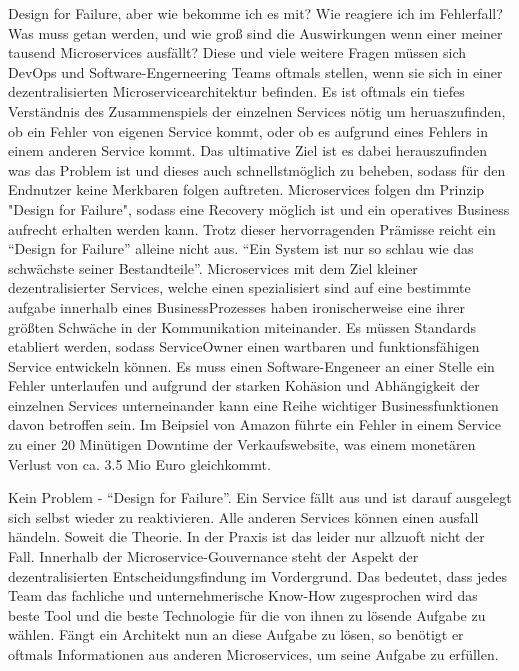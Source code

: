 \documentclass[
	12pt,
	BCOR=5mm,
	DIV=12,
	headinclude=on,
	footinclude=off,
	parskip=half,
	bibliography=totoc,
	listof=entryprefix,
	toc=listof,
	numbers=noenddot,
	plainfootsepline
]{scrreprt}
\begin{document}
Design for Failure, aber wie bekomme ich es mit? Wie reagiere ich im Fehlerfall? Was muss getan werden, und wie groß sind die Auswirkungen wenn einer meiner tausend Microservices ausfällt? Diese und viele weitere Fragen müssen sich DevOps und Software-Engerneering Teams oftmals stellen, wenn sie sich in einer dezentralisierten Microservicearchitektur befinden. Es ist oftmals ein tiefes Verständnis des Zusammenspiels der einzelnen Services nötig um heruaszufinden, ob ein Fehler von eigenen Service kommt, oder ob es aufgrund eines Fehlers in einem anderen Service kommt. Das ultimative Ziel ist es dabei herauszufinden was das Problem ist und dieses auch schnellstmöglich zu beheben, sodass für den Endnutzer keine Merkbaren folgen auftreten. Microservices folgen dm Prinzip "Design for Failure", sodass eine Recovery möglich ist und ein operatives Business aufrecht erhalten werden kann. Trotz dieser hervorragenden Prämisse reicht ein \enquote{Design for Failure} alleine nicht aus. \enquote{Ein System ist nur so schlau wie das schwächste seiner Bestandteile}. Microservices mit dem Ziel kleiner dezentralisierter Services, welche einen spezialisiert sind auf eine bestimmte aufgabe innerhalb eines BusinessProzesses haben ironischerweise eine ihrer größten Schwäche in der Kommunikation miteinander. Es müssen Standards etabliert werden, sodass ServiceOwner einen wartbaren und funktionsfähigen Service entwickeln können. Es muss einen Software-Engeneer an einer Stelle ein Fehler unterlaufen und aufgrund der starken Kohäsion und Abhängigkeit der einzelnen Services unterneinander kann eine Reihe wichtiger Businessfunktionen davon betroffen sein. Im Beipsiel von Amazon führte ein Fehler in einem Service zu einer 20 Minütigen Downtime der Verkaufswebsite, was einem monetären Verlust von ca. 3.5 Mio Euro gleichkommt.

Kein Problem - \enquote{Design for Failure}. Ein Service fällt aus und ist darauf ausgelegt sich selbst wieder zu reaktivieren. Alle anderen Services können einen ausfall händeln. Soweit die Theorie. In der Praxis ist das leider nur allzuoft nicht der Fall. Innerhalb der Microservice-Gouvernance steht der Aspekt der dezentralisierten Entscheidungsfindung im Vordergrund. Das bedeutet, dass jedes Team das fachliche und unternehmerische Know-How zugesprochen wird das beste Tool und die beste Technologie für die von ihnen zu lösende Aufgabe zu wählen. Fängt ein Architekt nun an diese Aufgabe zu lösen, so benötigt er oftmals Informationen aus anderen Microservices, um seine Aufgabe zu erfüllen. 
\end{document}
